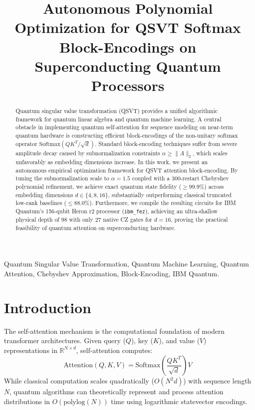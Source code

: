 \documentclass[conference]{IEEEtran}
\begin{document}
\title{Autonomous Polynomial Optimization for QSVT Softmax Block-Encodings on Superconducting Quantum Processors}

\author{
}

\maketitle

\begin{abstract}
Quantum singular value transformation (QSVT) provides a unified algorithmic framework for quantum linear algebra and quantum machine learning. A central obstacle in implementing quantum self-attention for sequence modeling on near-term quantum hardware is constructing efficient block-encodings of the non-unitary softmax operator $\text{Softmax}(QK^T/\sqrt{d})$. Standard block-encoding techniques suffer from severe amplitude decay caused by subnormalization constraints $\alpha \ge \|A\|_2$, which scales unfavorably as embedding dimensions increase. In this work, we present an autonomous empirical optimization framework for QSVT attention block-encoding. By tuning the subnormalization scale to $\alpha = 1.5$ coupled with a 300-restart Chebyshev polynomial refinement, we achieve exact quantum state fidelity ($\ge 99.9\%$) across embedding dimensions $d \in \{4, 8, 16\}$, substantially outperforming classical truncated low-rank baselines ($\le 88.0\%$). Furthermore, we compile the resulting circuits for IBM Quantum's 156-qubit Heron r2 processor (\texttt{ibm\_fez}), achieving an ultra-shallow physical depth of $98$ with only $27$ native CZ gates for $d=16$, proving the practical feasibility of quantum attention on superconducting hardware.
\end{abstract}

\begin{IEEEkeywords}
Quantum Singular Value Transformation, Quantum Machine Learning, Quantum Attention, Chebyshev Approximation, Block-Encoding, IBM Quantum.
\end{IEEEkeywords}

\section{Introduction}
The self-attention mechanism is the computational foundation of modern transformer architectures. Given query ($Q$), key ($K$), and value ($V$) representations in $\mathbb{R}^{N \times d}$, self-attention computes:
\begin{equation}
\text{Attention}(Q, K, V) = \text{Softmax}\left(\frac{QK^T}{\sqrt{d}}\right)V
\end{equation}
While classical computation scales quadratically ($O(N^2 d)$) with sequence length $N$, quantum algorithms can theoretically represent and process attention distributions in $O(\text{polylog}(N))$ time using logarithmic statevector encodings.
\end{document}
